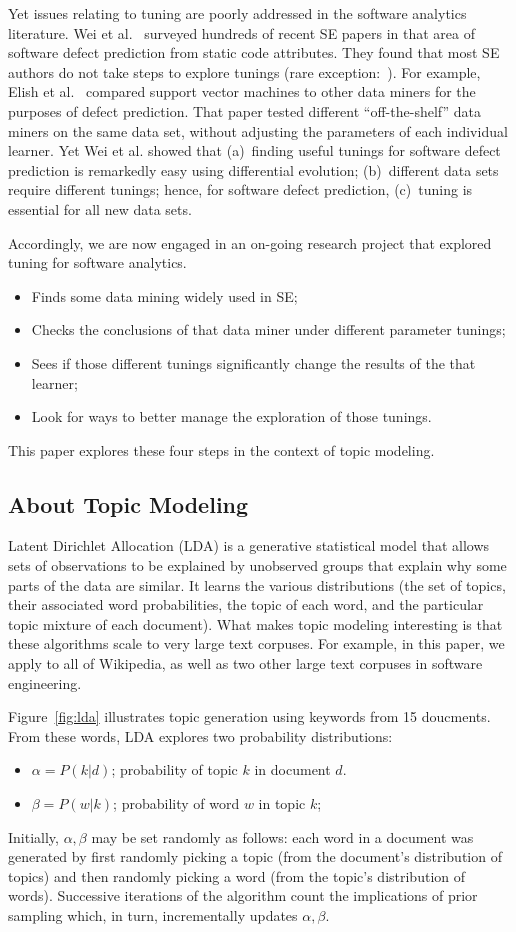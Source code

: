 \documentclass[10pt,conference]{IEEEtran}
\newcommand{\bi}{\begin{itemize}}
\newcommand{\ei}{\end{itemize}}
\theoremstyle{break}
\begin{document}
Yet issues relating to
tuning are poorly addressed in the software analytics literature.  Wei et al.~\cite{fu2016tuning} surveyed hundreds of recent SE papers in that area
of software defect prediction from static code attributes. They found that most SE
  authors do not take steps to explore tunings (rare exception:~\cite{tantithamthavorn2016icse}). For example, Elish et
  al.~\cite{elish2008predicting} compared support vector machines to other data
  miners for the purposes of defect prediction. That paper tested different
  “off-the-shelf” data miners on the same data set, without adjusting the
  parameters of each individual learner.  Yet Wei et al.
  showed that (a)~finding useful tunings for software defect prediction is remarkedly
  easy using differential evolution;  (b)~different data sets require
  different tunings; hence, for software defect prediction,  (c)~tuning is essential for  all
  new data sets.


Accordingly,  we are now engaged in an  on-going research project that explored tuning for software analytics.
\bi
\item Finds some data mining widely used in SE;
\item Checks the conclusions of that data miner under different parameter tunings;
\item Sees if those different tunings significantly change the results of the that learner;
\item Look for ways to better manage the exploration of those tunings.  \ei This
  paper explores these four steps in the context of topic modeling. 


  

\subsection{About Topic Modeling}\label{sect:tm}

Latent Dirichlet Allocation (LDA) is a generative statistical model that allows
sets of observations to be explained by unobserved groups that explain why some
parts of the data are similar. It learns the various distributions (the set of
topics, their associated word probabilities, the topic of each word, and the
particular topic mixture of each document).
What makes topic modeling interesting is that these algorithms scale to very
large text corpuses.  For example, in this paper, we apply to all of Wikipedia,
as well as two other large text corpuses in software engineering.


Figure~\ref{fig:lda} illustrates topic generation using  keywords from 15 doucments.
From these words, LDA explores two probability distributions:
\bi
\item $\alpha=P(k|d)$; probability of topic $k$ in  document $d$.
\item $\beta=P(w|k)$; probability of word $w$ in topic $k$; 
\ei
  Initially, $\alpha,\beta$ may be set randomly as follows:
each word in a document was generated by first randomly picking a topic (from
the document’s distribution of topics) and then randomly picking a word (from
the topic’s distribution of words). Successive iterations of the algorithm 
count the implications of prior sampling which, in turn,  incrementally updates $\alpha,\beta$.
\end{document}
